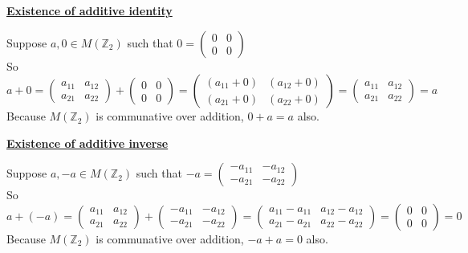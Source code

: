 \documentclass{article} %
\begin{document}
\begin{addmargin}[1em]{0em}
\underline{\textbf{Existence of additive identity}}
\begin{addmargin}[1em]{0em}
Suppose $a , 0 \in M(\mathbb{Z}_2)$ such that $ 0 = \left(\begin{smallmatrix} 0 & 0 \\ 0 & 0 \end{smallmatrix}\right)$
\\So $a + 0 = \left( \begin{smallmatrix} a_{11} & a_{12} \\ a_{21} & a_{22} \end{smallmatrix} \right) + \left(\begin{smallmatrix} 0 & 0 \\ 0 & 0 \end{smallmatrix}\right) = 
\left( \begin{smallmatrix} (a_{11} + 0) & (a_{12} + 0) \\ (a_{21} + 0) & (a_{22} + 0) \end{smallmatrix} \right) =
\left( \begin{smallmatrix} a_{11} & a_{12} \\ a_{21} & a_{22} \end{smallmatrix} \right) =
a$
\\Because $M(\mathbb{Z}_2)$ is communative over addition, $0 + a = a$ also.
\end{addmargin}

\underline{\textbf{Existence of additive inverse}}
\begin{addmargin}[1em]{0em}
Suppose $a, -a \in M(\mathbb{Z}_2)$ such that $-a = \left( \begin{smallmatrix} -a_{11} & -a_{12} \\ -a_{21} & -a_{22} \end{smallmatrix} \right)$
\\So $a + (-a) = \left( \begin{smallmatrix} a_{11} & a_{12} \\ a_{21} & a_{22} \end{smallmatrix} \right) + \left( \begin{smallmatrix} -a_{11} & -a_{12} \\ -a_{21} & -a_{22} \end{smallmatrix} \right) = 
\left( \begin{smallmatrix} a_{11}  -a_{11} & a_{12}  -a_{12} \\ a_{21}  -a_{21} & a_{22} -a_{22} \end{smallmatrix} \right) =
 \left(\begin{smallmatrix} 0 & 0 \\ 0 & 0 \end{smallmatrix}\right) = 
0$
\\Because $M(\mathbb{Z}_2)$ is communative over addition, $-a + a = 0$ also.
\end{addmargin}


\end{addmargin}
\end{document}
